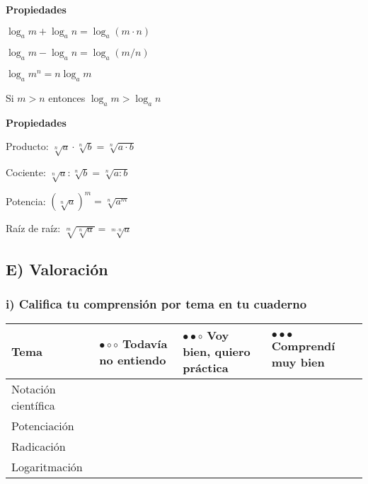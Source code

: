 \documentclass[12pt,a4paper]{article}
\begin{document}
\begin{minipage}[t]{0.48\textwidth}
\begin{tcolorbox}[colback=fondoazul,colframe=azuloscuro,breakable]
\textbf{Propiedades}

$\log_a m + \log_a n = \log_a(m \cdot n)$

$\log_a m - \log_a n = \log_a(m/n)$

$\log_a m^n = n \log_a m$

Si $m > n$ entonces $\log_a m > \log_a n$
\end{tcolorbox}
\end{minipage}
\hfill
\begin{minipage}[t]{0.48\textwidth}
\begin{tcolorbox}[colback=fondoverde,colframe=verdeclaro,breakable]
\textbf{Propiedades}

Producto: $\sqrt[n]{a} \cdot \sqrt[n]{b} = \sqrt[n]{a \cdot b}$

Cociente: $\sqrt[n]{a} : \sqrt[n]{b} = \sqrt[n]{a:b}$

Potencia: $(\sqrt[n]{a})^m = \sqrt[n]{a^m}$

Raíz de raíz: $\sqrt[m]{\sqrt[n]{a}} = \sqrt[m \cdot n]{a}$
\end{tcolorbox}
\end{minipage}


\subsection*{E) Valoración}

\subsubsection*{i) Califica tu comprensión por tema en tu cuaderno}

\vspace{0.5cm}

\begin{center}
\small
\begin{tabular}{|p{}|p{}|p{}|p{}|}
\hline
\cellcolor{fondoazul}\textbf{Tema} & \textbf{$\bullet\circ\circ$} Todavía no entiendo & \textbf{$\bullet\bullet\circ$} Voy bien, quiero práctica & \textbf{$\bullet\bullet\bullet$} Comprendí muy bien \\
\hline
Notación científica & & & \\[0.5cm]
\hline
Potenciación & & & \\[0.5cm]
\hline
Radicación & & & \\[0.5cm]
\hline
Logaritmación & & & \\[0.5cm]
\hline
\end{tabular}
\normalsize
\end{center}
\end{document}
